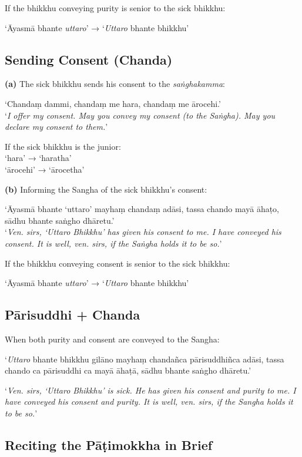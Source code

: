If the bhikkhu conveying purity is senior to the sick bhikkhu:

‘Āyasmā bhante \emph{uttaro}’ → ‘\emph{Uttaro} bhante bhikkhu’

\subsection{Sending Consent (Chanda)}

\textbf{(a)} The sick bhikkhu sends his consent to the \emph{saṅghakamma}:

‘Chandaṃ dammi, chandaṃ me hara, chandaṃ me ārocehi.’\\
‘\emph{I offer my consent. May you convey my consent (to the Saṅgha). May you
  declare my consent to them.}’

If the sick bhikkhu is the junior:\\
‘hara’ → ‘haratha’\\
‘ārocehi’ → ‘ārocetha’

\textbf{(b)} Informing the Sangha of the sick bhikkhu's consent:

‘Āyasmā bhante ‘uttaro’ mayhaṃ chandaṃ adāsi, tassa chando mayā āhaṭo, sādhu bhante saṅgho dhāretu.’\\
‘\emph{Ven. sirs, ‘Uttaro Bhikkhu’ has given his consent to me. I have conveyed
  his consent. It is well, ven. sirs, if the Saṅgha holds it to be so.}’

If the bhikkhu conveying consent is senior to the sick bhikkhu:

‘Āyasmā bhante \emph{uttaro}’ → ‘\emph{Uttaro} bhante bhikkhu’

\subsection{Pārisuddhi + Chanda}

When both purity and consent are conveyed to the Sangha:

‘\emph{Uttaro} bhante bhikkhu gilāno mayhaṃ chandañca pārisuddhiñca adāsi, tassa
chando ca pārisuddhi ca mayā āhaṭā, sādhu bhante saṅgho dhāretu.’

‘\emph{Ven. sirs, ‘Uttaro Bhikkhu’ is sick. He has given his consent and purity
  to me. I have conveyed his consent and purity. It is well, ven. sirs, if the
  Sangha holds it to be so.}’

\clearpage

\subsection{Reciting the Pāṭimokkha in Brief}

